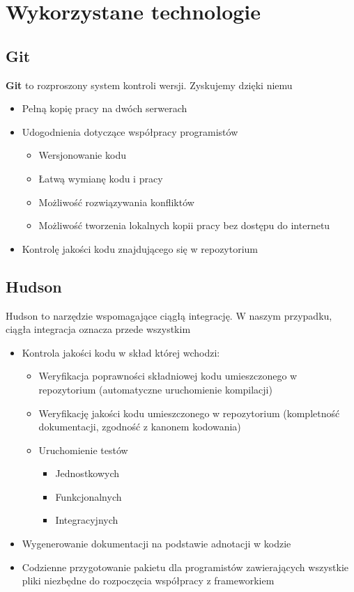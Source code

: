 \section{Wykorzystane technologie}
\subsection{Git}
\textbf{Git} to rozproszony system kontroli wersji. Zyskujemy dzięki niemu
\begin{itemize}
 \item Pełną kopię pracy na dwóch serwerach
 \item Udogodnienia dotyczące współpracy programistów \begin{itemize}
  \item Wersjonowanie kodu
  \item Łatwą wymianę kodu i pracy
  \item Możliwość rozwiązywania konfliktów
  \item Możliwość tworzenia lokalnych kopii pracy bez dostępu do internetu
  \end{itemize}
 \item Kontrolę jakości kodu znajdującego się w repozytorium
\end{itemize}

\subsection{Hudson}
Hudson to narzędzie wspomagające ciągłą integrację. W naszym przypadku, ciągła integracja oznacza przede wszystkim
\begin{itemize}
 \item Kontrola jakości kodu w skład której wchodzi: \begin{itemize}
  \item Weryfikacja poprawności składniowej kodu umieszczonego w repozytorium (automatyczne uruchomienie kompilacji)
  \item Weryfikację jakości kodu umieszczonego w repozytorium (kompletność dokumentacji, zgodność z kanonem kodowania)
  \item Uruchomienie testów \begin{itemize}
   \item Jednostkowych
   \item Funkcjonalnych
   \item Integracyjnych
   \end{itemize}
  \end{itemize}
 \item Wygenerowanie dokumentacji na podstawie adnotacji w kodzie
 \item Codzienne przygotowanie pakietu dla programistów zawierających wszystkie pliki niezbędne do rozpoczęcia współpracy z frameworkiem
\end{itemize}

